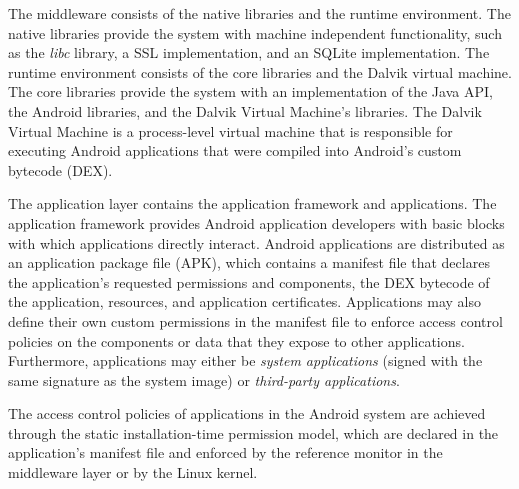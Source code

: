 The middleware consists of the native libraries 
and the runtime environment. The native libraries provide the 
system with machine independent functionality, such as the \textit{libc} 
library, a SSL implementation, and an SQLite implementation. 
The runtime environment consists of the core libraries and the 
Dalvik virtual machine. The core libraries provide the system 
with an implementation of the Java API, the Android libraries, 
and the Dalvik Virtual Machine's libraries. The Dalvik Virtual 
Machine is a process-level virtual machine that is responsible 
for executing Android applications that were compiled into 
Android's custom bytecode (DEX). 

The application layer contains the application framework and 
applications. The application framework provides Android 
application developers with basic blocks with which 
applications directly interact.
Android applications are distributed as an application
package file (APK), which contains a manifest file that declares
the application's requested permissions and components, the DEX
bytecode of the application, resources, and application
certificates.  Applications may also define their own custom
permissions in the manifest file to enforce access control
policies on the components or data that they expose to other
applications.  Furthermore, applications may either be
\textit{system applications} (signed with the same signature
as the system image) or \textit{third-party applications}.

The access control policies of applications in the Android
system are achieved through the static installation-time
permission model, which are declared in the application's
manifest file and enforced by the reference monitor in the
middleware layer or by the Linux kernel.  


